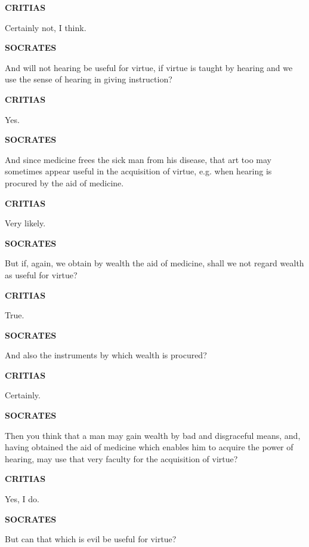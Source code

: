 \documentclass[11pt,letter]{article}
\begin{document}
\par \textbf{CRITIAS}
\par   Certainly not, I think.

\par \textbf{SOCRATES}
\par   And will not hearing be useful for virtue, if virtue is taught by hearing and we use the sense of hearing in giving instruction?

\par \textbf{CRITIAS}
\par   Yes.

\par \textbf{SOCRATES}
\par   And since medicine frees the sick man from his disease, that art too may sometimes appear useful in the acquisition of virtue, e.g. when hearing is procured by the aid of medicine.

\par \textbf{CRITIAS}
\par   Very likely.

\par \textbf{SOCRATES}
\par   But if, again, we obtain by wealth the aid of medicine, shall we not regard wealth as useful for virtue?

\par \textbf{CRITIAS}
\par   True.

\par \textbf{SOCRATES}
\par   And also the instruments by which wealth is procured?

\par \textbf{CRITIAS}
\par   Certainly.

\par \textbf{SOCRATES}
\par   Then you think that a man may gain wealth by bad and disgraceful means, and, having obtained the aid of medicine which enables him to acquire the power of hearing, may use that very faculty for the acquisition of virtue?

\par \textbf{CRITIAS}
\par   Yes, I do.

\par \textbf{SOCRATES}
\par   But can that which is evil be useful for virtue?
\end{document}
